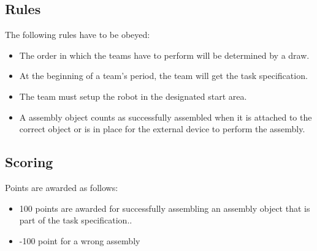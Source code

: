 \subsection{Rules}
The following rules have to be obeyed:

\begin{itemize}
\item The order in which the teams have to perform will be determined by a draw.
\item At the beginning of a team's period, the team will get the task specification. 
\item The team must setup the robot in the designated start area.
\item A assembly object counts as successfully assembled when it is attached to the correct object or is in place for the external device to perform the assembly.
\end{itemize}


\subsection{Scoring}
Points are awarded as follows:

\begin{itemize}
\item 100 points are awarded for successfully assembling an assembly object that is part of the task specification..
\item -100 point for a wrong assembly
\end{itemize}

